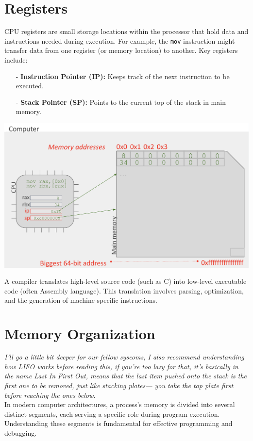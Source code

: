 \section{Registers}
\begin{minipage}{0.45\textwidth}
CPU registers are small storage locations within the processor that hold data and instructions needed during execution. For example, the \texttt{mov} instruction might transfer data from one register (or memory location) to another. Key registers include:
\begin{itemize}
  \item[-] \textbf{Instruction Pointer (IP):} Keeps track of the next instruction to be executed.
  \item[-] \textbf{Stack Pointer (SP):} Points to the current top of the stack in main memory.
\end{itemize}
\end{minipage}
\hfill
\vline
\hfill
\begin{minipage}{0.45\textwidth} 
\begin{center}
    \includegraphics[width=1.1\textwidth]{chapters/L2/images/registers.png}
\end{center}
\end{minipage}
\newpage
\begin{definition}[Compiler]
A compiler translates high-level source code (such as C) into low-level executable code (often Assembly language). This translation involves parsing, optimization, and the generation of machine-specific instructions.
\end{definition}

\section{Memory Organization}
\textit{I'll go a little bit deeper for our fellow syscoms, I also recommend understanding how LIFO works before reading this, if you're too lazy for that, it's basically in the name Last In First Out, means that the last item pushed onto the stack is the first one to be removed, just like stacking plates— you take the top plate first before reaching the ones below. } \\
In modern computer architectures, a process's memory is divided into several distinct segments, each serving a specific role during program execution. Understanding these segments is fundamental for effective programming and debugging. \\[10px]

